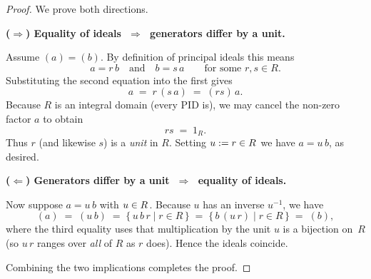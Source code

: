 \documentclass[12pt]{article}
\theoremstyle{definition} %
\theoremstyle{plain} %
\begin{document}
\begin{proof}
  We prove both directions.

  \medskip
  \noindent\textbf{($\Rightarrow$)  Equality of ideals $\;\Longrightarrow\;$ generators differ by a unit.}

  Assume $(a)=(b)$.  
  By definition of principal ideals this means
  \[
      a = r\,b 
      \quad\text{and}\quad
      b = s\,a
      \qquad\text{for some } r,s\in R .
  \]
  Substituting the second equation into the first gives
  \[
      a \;=\; r\,(s\,a) \;=\; (rs)\,a .
  \]
  Because $R$ is an integral domain (every PID is), we may cancel
  the non-zero factor $a$ to obtain
  \[
      rs \;=\; 1_R .
  \]
  Thus $r$ (and likewise $s$) is a \emph{unit} in $R$.  
  Setting $u:=r\in R^{\*}$ we have $a=u\,b$, as desired.

  \medskip
  \noindent\textbf{($\Leftarrow$)  Generators differ by a unit $\;\Longrightarrow\;$ equality of ideals.}

  Now suppose $a = u\,b$ with $u\in R^{\*}$.  
  Because $u$ has an inverse $u^{-1}$, we have
  \[
      (a) \;=\; (u\,b)
            \;=\; \{\,u\,b\,r \mid r\in R\,\}
            \;=\; \{\,b\,(u\,r) \mid r\in R\,\}
            \;=\; (b),
  \]
  where the third equality uses that multiplication by the unit $u$
  is a bijection on~$R$ (so $u\,r$ ranges over \emph{all} of $R$ as
  $r$ does).  Hence the ideals coincide.

  \medskip
  Combining the two implications completes the proof.
\end{proof}
\end{document}
